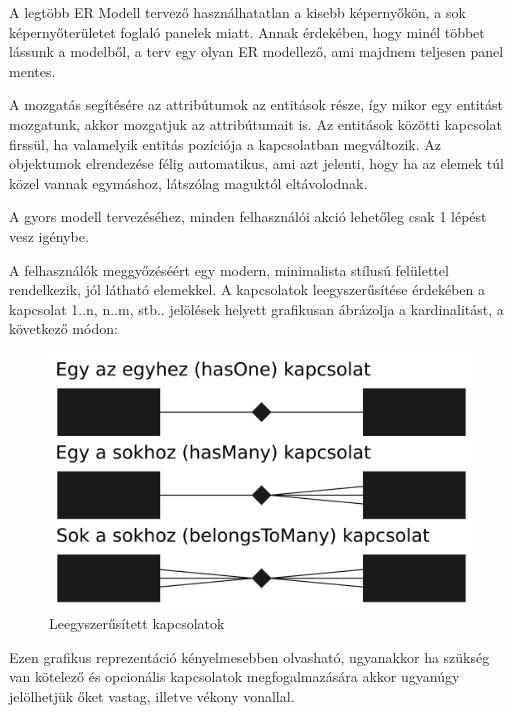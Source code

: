 \documentclass[a4paper,12pt,oneside]{report}
\begin{document}
\begin{justify}

	A legtöbb ER Modell tervező használhatatlan a kisebb képernyőkön, a sok képernyőterületet foglaló panelek miatt. Annak érdekében, hogy minél többet lássunk a modelből, a terv egy olyan ER modellező, ami majdnem teljesen panel mentes. 

	A mozgatás segítésére az attribútumok az entitások része, így mikor egy entitást mozgatunk, akkor mozgatjuk az attribútumait is. Az entitások közötti kapcsolat firssül, ha valamelyik entitás pozíciója a kapcsolatban megváltozik. Az objektumok elrendezése félig automatikus, ami azt jelenti, hogy ha az elemek túl közel vannak egymáshoz, látszólag maguktól eltávolodnak.

	A gyors modell tervezéséhez, minden felhasználói akció lehetőleg csak 1 lépést vesz igénybe.

	A felhasználók meggyőzéséért egy modern, minimalista stílusú felülettel rendelkezik, jól látható elemekkel. A kapcsolatok leegyszerűsítése érdekében a kapcsolat 1..n, n..m, stb.. jelölések helyett grafikusan ábrázolja a kardinalitást, a következő módon:

	\begin{figure}[h]
		\includegraphics[width=\textwidth]{contents/images/simplified_relations.png}
		\caption{Leegyszerűsített kapcsolatok}
		\label{fig:simplified_relations}
	\end{figure}

	Ezen grafikus reprezentáció kényelmesebben olvasható, ugyanakkor ha szükség van kötelező és opcionális kapcsolatok megfogalmazására akkor ugyanúgy jelölhetjük őket vastag, illetve vékony vonallal. 

\end{justify}
\end{document}
